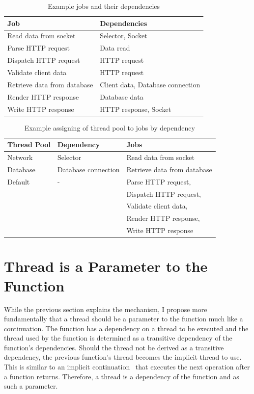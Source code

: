 \documentclass[conference]{ieee/IEEEtran}
\begin{document}
\begin{table}[!t]
\renewcommand{\arraystretch}{1.3}
\caption{Example jobs and their dependencies}
\label{tab:example_request_jobs}
\centering
\begin{tabular}{l||l}
\hline
\bfseries Job & \bfseries Dependencies \\
\hline\hline
Read data from socket & Selector, Socket \\
\hline
Parse HTTP request & Data read \\
\hline
Dispatch HTTP request & HTTP request \\
\hline
Validate client data & HTTP request \\
\hline
Retrieve data from database & Client data, Database connection \\
\hline
Render HTTP response & Database data \\
\hline
Write HTTP response & HTTP response, Socket \\
\hline
\end{tabular}
\end{table}

\begin{table}[!t]
\renewcommand{\arraystretch}{1.3}
\caption{Example assigning of thread pool to jobs by dependency}
\label{tab:example_request_thread_pools}
\centering
\begin{tabular}{l||l||l}
\hline
\bfseries Thread Pool & \bfseries Dependency & \bfseries Jobs \\
\hline\hline
Network & Selector & Read data from socket \\
\hline
Database & Database connection & Retrieve data from database \\
\hline
Default & - & Parse HTTP request, \\
& & Dispatch HTTP request, \\
& & Validate client data, \\ 
& & Render HTTP response, \\
& & Write HTTP response \\
\hline
\end{tabular}
\end{table}

\section{Thread is a Parameter to the Function}
While the previous section explains the mechanism, I propose more fundamentally
that a thread should be a parameter to the function much like a continuation.
The function has a dependency on a thread to be executed and the thread used by
the function is determined as a transitive dependency of the function's
dependencies.  Should the thread not be derived as a transitive dependency, the
previous function's thread becomes the implicit thread to use.  This is similar
to an implicit continuation~\cite{continuations} that executes the next
operation after a function returns.  Therefore, a thread is a dependency of
the function and as such a parameter.
\end{document}
